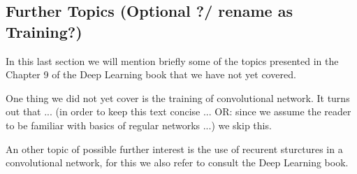 \documentclass[]{article}
\begin{document}
%

\subsection{Further Topics (Optional ?/ rename as Training?)}
In this last section we will mention briefly some of the topics presented in the
Chapter 9 of the Deep Learning book that we have not yet covered.

One thing we did not yet cover is the training of convolutional network. It turns
out that ... (in order to keep this text concise ... OR: since we assume the reader
to be familiar with basics of regular networks ...) we skip this.

An other topic of possible further interest is the use of recurent sturctures in
a convolutional network, for this we also refer to consult the Deep Learning book.





\end{document}
